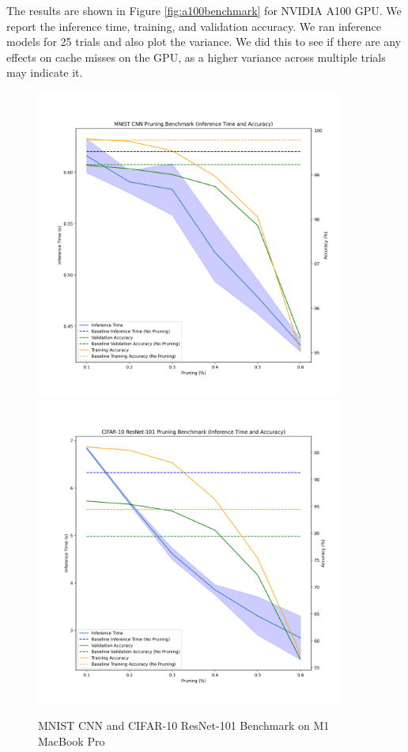 \documentclass{article}
\begin{document}
The results are shown in Figure \ref{fig:a100benchmark} for NVIDIA A100 GPU. We report the inference time, training, and validation accuracy. We ran inference models for 25 trials and also plot the variance. We did this to see if there are any effects on cache misses on the GPU, as a higher variance across multiple trials may indicate it.

\begin{figure}
	\centerline{
		\includegraphics[width=4in]{../proj1/figures/mnist_cnn_benchmarkm1.png}
		\includegraphics[width=4in]{../proj1/figures/resnet101_benchmarkm1.png}
	}
	\caption{MNIST CNN and CIFAR-10 ResNet-101 Benchmark on M1 MacBook Pro}
	\label{fig:m1benchmark}
\end{figure}
\end{document}
